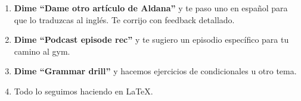 \documentclass[11pt,a4paper]{article}
\begin{document}
\begin{enumerate}
    \item \textbf{Dime ``Dame otro artículo de Aldana''} y te paso uno en español 
          para que lo traduzcas al inglés. Te corrijo con feedback detallado.
    \item \textbf{Dime ``Podcast episode rec''} y te sugiero un episodio 
          específico para tu camino al gym.
    \item \textbf{Dime ``Grammar drill''} y hacemos ejercicios de condicionales 
          u otro tema.
    \item Todo lo seguimos haciendo en \LaTeX.
\end{enumerate}
\end{document}
